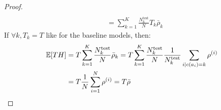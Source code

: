 \begin{proof}
\begin{align*}
        \\
        &= \sum_{k=1}^{K}{\frac{N_k^{\text{test}}}{N} T_k \bar{\rho}_k}%
    \end{align*}
    If $\forall k, T_k = T$ like for the baseline models, then:
    \begin{align*}
        \mathbb{E}\off{T H} &= T \sum_{k=1}^{K}{\frac{N_k^{\text{test}}}{N} \bar{\rho}_k}%
        = T \sum_{k=1}^{K}{\frac{N_k^{\text{test}}}{N} \frac{1}{N_k^{\text{test}}}\sum_{i \mid c\of{a_i}=k}{\rho^{\of{i}}}}%
        \\
        &= T \frac{1}{N} \sum_{i=1}^{N}{\rho^{\of{i}}}%
        = T \bar{\rho}%
    \end{align*}
\end{proof}

